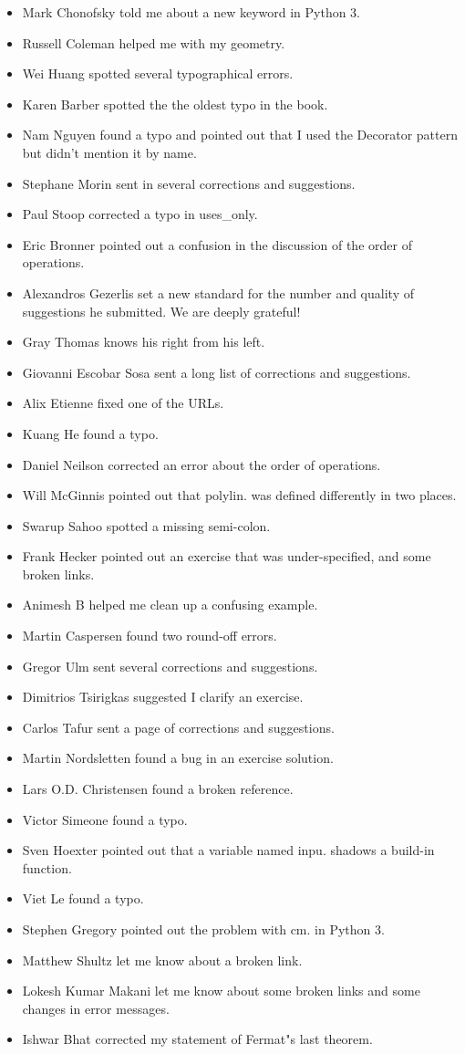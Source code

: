 \begin{itemize}
\item Mark Chonofsky told me about a new keyword in Python 3. 
\item Russell Coleman helped me with my geometry. 
\item Wei Huang spotted several typographical errors. 
\item Karen Barber spotted the the oldest typo in the book. 
\item Nam Nguyen found a typo and pointed out that I used the Decorator pattern
but didn't mention it by name. 
\item Stephane Morin sent in several corrections and suggestions. 
\item Paul Stoop corrected a typo in uses\_only. 
\item Eric Bronner pointed out a confusion in the discussion of the order of operations. 
\item Alexandros Gezerlis set a new standard for the number and quality of suggestions he submitted. 
We are deeply grateful! 
\item Gray Thomas knows his right from his left. 
\item Giovanni Escobar Sosa sent a long list of corrections and suggestions. 
\item Alix Etienne fixed one of the URLs. 
\item Kuang He found a typo. 
\item Daniel Neilson corrected an error about the order of operations. 
\item Will McGinnis pointed out that polylin. 
was defined differently in two places. 
\item Swarup Sahoo spotted a missing semi-colon. 
\item Frank Hecker pointed out an exercise that was under-specified, and some broken links. 
\item Animesh B helped me clean up a confusing example. 
\item Martin Caspersen found two round-off errors. 
\item Gregor Ulm sent several corrections and suggestions. 
\item Dimitrios Tsirigkas suggested I clarify an exercise. 
\item Carlos Tafur sent a page of corrections and suggestions. 
\item Martin Nordsletten found a bug in an exercise solution. 
\item Lars O.D. Christensen found a broken reference. 
\item Victor Simeone found a typo. 
\item Sven Hoexter pointed out that a variable named inpu. 
shadows a build-in function. 
\item Viet Le found a typo. 
\item Stephen Gregory pointed out the problem with cm. 
in Python 3. 
\item Matthew Shultz let me know about a broken link. 
\item Lokesh Kumar Makani let me know about some broken links and some changes in error messages. 
\item Ishwar Bhat corrected my statement of Fermat"s last theorem. 
\end{itemize}

